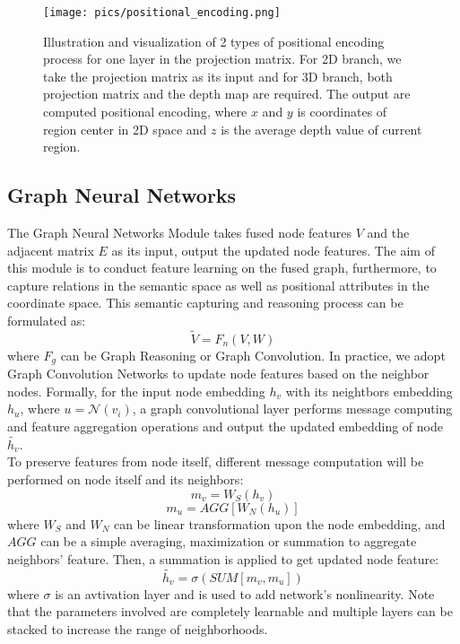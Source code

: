 ﻿\documentclass[journal]{IEEEtran}
\begin{document}
    
    \begin{figure}
        \centering
        \texttt{[image: pics/positional\_encoding.png]}
        \caption{Illustration and visualization of 2 types of positional encoding process for one
        layer in the projection matrix. For 2D branch, we take the projection matrix as its input and for 3D branch, both projection matrix and the depth map are required. The output are computed positional encoding, where $x$ and $y$ is coordinates of region center in 2D space and $z$ is the average depth value of current region. }
        \label{fig_pos_encoding}
    \end{figure}  



\subsection{Graph Neural Networks}
 
    The Graph Neural Networks Module takes fused node features $V$ and the adjacent matrix $E$ as its input, output the updated node features. The aim of this module is to conduct feature learning on the fused graph, furthermore, to capture relations in the semantic space as well as positional attributes in the coordinate space. This semantic capturing and reasoning process can be formulated as:
    \begin{equation}
        \tilde{V} = F_n(V, W)
    \end{equation}
    where  $F_g$ can be Graph Reasoning or Graph Convolution. In practice, we adopt Graph Convolution Networks \cite{kipf2016GCN} to update node features based on the neighbor nodes. Formally, for the input node embedding $h_v$ with its neightbors embedding $h_u$, where $u={\mathcal{N}(v_i)}$, a graph convolutional layer performs message computing and feature aggregation operations and output the updated embedding of node $\tilde{h_{v}}$. \\   

 
    To preserve features from node itself, different message computation will be performed on node itself and its neighbors:
    \begin{equation}
        m_{v} = W_{S}(h_v)
    \end{equation}
    \begin{equation}
        m_{u} = AGG[W_{N}(h_u)]
    \end{equation}
    where $W_S$ and $W_N$ can be linear transformation upon the node embedding, and $AGG$ can be a simple averaging, maximization or summation to aggregate neighbors' feature. Then, a summation is applied to get updated node feature:
    \begin{equation}
        \tilde{h_{v}} = \sigma(SUM[m_{v}, m_{u}])
    \end{equation}
    where $\sigma$ is an avtivation layer and is used to add network's nonlinearity. Note that the parameters involved are completely learnable and multiple layers can be stacked to increase the range of neighborhoods.
    \\   
\end{document}
